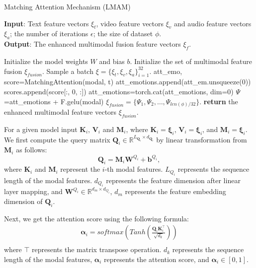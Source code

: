 {{\begin{algorithm}[tb]
	\caption{Matching Attention Mechanism (LMAM)}
	\label{alg:algorithm}
	\textbf{Input}: Text feature vectors $\xi_t$, video feature vectors $\xi_v$ and audio feature vectors $\xi_a$; the number of iterations $\epsilon$; the size of dataset $\phi$.\\ 
	
	\textbf{Output}: The enhanced multimodal fusion feature vectors $\xi_f$.
	
	\begin{algorithmic}[1] %
		\STATE Initialize the model weights $W$ and bias $b$.
		\STATE Initialize the set of multimodal feature fusion $\xi_{fusion}$.
		\STATE Sample a batch $\xi=\{\xi_t, \xi_v, \xi_a\}_{i=1}^{32}$.
		\STATE att\_emo, score=MatchingAttention(modal, t)
		\STATE att\_emotions.append(att\_em.unsqueeze(0))
		\STATE scores.append(score[:, 0, :])
		\ENDFOR
		\STATE att\_emotions=torch.cat(att\_emotions, dim=0)
		\STATE $\varPsi$   =att\_emotions + F.gelu(modal)
		\ENDFOR
		\ENDFOR
		\ENDFOR
		\STATE $\xi_{fusion}=\{\varPsi_1,\varPsi_2,\ldots,\varPsi_{len(\phi)/32}\}$.
		\STATE \textbf{return} the enhanced multimodal feature vectors $\xi_{fusion}$.
	\end{algorithmic}
\end{algorithm}

{For a given model input $\boldsymbol{K}_i$, $\boldsymbol{V}_i$ and $\boldsymbol{M}_i$, {where $\boldsymbol{K}_i = \boldsymbol{\xi}_i$, $\boldsymbol{V}_i = \boldsymbol{\xi}_i$, and $\boldsymbol{M}_i = \boldsymbol{\xi}_i$.} We first compute the query matrix $\boldsymbol{Q}_i \in \mathbb{R}^{L_{\boldsymbol{Q}_i} \times d_{\boldsymbol{Q}_i}}$ {by linear transformation from $\boldsymbol{M}_i$} as follows:}
\begin{equation}
	\boldsymbol{Q}_i = \boldsymbol{M}_i\boldsymbol{W}^{{Q}_i}+\boldsymbol{b}^{{Q}_i},
\end{equation}
{where $\boldsymbol{K}_i$ and $\boldsymbol{M}_i$ represent the $i$-th modal features. {$L_{{Q}_i}$} represents the sequence length of the modal features. $d_{{Q}_i}$ represents the feature dimension after linear layer mapping, and $\boldsymbol{W}^{{Q}_i} \in \mathbb{R}^{d_m \times d_{{Q}_i}}$, $d_m$ represents the feature embedding dimension of $\boldsymbol{Q}_i$.}
 

Next, we get the attention score using the following formula:
\begin{equation}	
	\begin{aligned}
	\boldsymbol{\alpha}_i=softmax\left(Tanh\left(\frac{\boldsymbol{Q}_i \boldsymbol{K}_i^\top}{\sqrt{d_k}}\right)\right) \\
	\end{aligned}
\end{equation}
{where $\top$ represents the matrix transpose operation. $d_k$  represents the sequence length of the modal features, $\boldsymbol{\alpha}_i$ represents the attention score, and $\boldsymbol{\alpha}_i \in [0,1]$.}

}}

